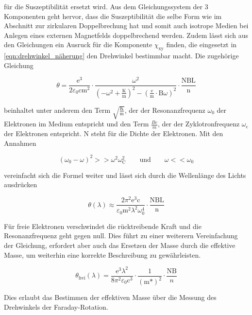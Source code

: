         für die Suszeptibilität ersetzt wird. Aus dem Gleichungssystem der 3 Komponenten geht hervor, dass die Suszeptibilität die selbe Form wie im Abschnitt zur zirkularen Doppelbrechung hat und somit auch 
        isotrope Medien bei Anlegen eines externen Magnetfelds doppelbrechend werden. Zudem lässt sich aus den Gleichungen ein Ausruck für die Komponente $\chi_{\text{xy}}$ finden, die eingesetzt in 
        \ref{eqn:drehwinkel_näherung} den Drehwinkel bestimmbar macht. Die zugehörige Gleichung

        \begin{equation*}
            \theta = \frac{\text{e}^3}{2\varepsilon_0\text{cm}^2} \cdot \frac{\omega^2}{\left(-\omega^2 + \frac{\text{K}}{\text{m}}\right)^2 - \left(\frac{\text{e}}{\text{m}} \cdot \text{B} \omega\right)^2} \cdot \frac{\text{NBL}}{\text{n}}
        \end{equation*}

        beinhaltet unter anderem den Term $\sqrt{\frac{\text{K}}{\text{m}}}$, der der Resonanzfrequenz $\omega_0$ der Elektronen im Medium entspricht und den Term $\frac{Be}{m}$, der der Zyklotronfrequenz 
        $\omega_{\text{c}}$ der Elektronen entspricht. N steht für die Dichte der Elektronen. Mit den Annahmen
        
        \begin{equation*}
            \left(\omega_0 - \omega\right)^2 >> \omega^2 \omega_{\text{C}}^2 \qquad \text{und} \qquad \omega << \omega_0
        \end{equation*}

        vereinfacht sich die Formel weiter und lässt sich durch die Wellenlänge des Lichts ausdrücken

        \begin{equation*}
            \theta(\lambda) \approx \frac{2\pi^2\text{e}^3\text{c}}{\varepsilon_0 \text{m}^2 \lambda^2 \omega_0^4} \cdot \frac{\text{NBL}}{\text{n}}
        \end{equation*}

        Für freie Elektronen verschwindet die rücktreibende Kraft und die Resonanzfrequenz geht gegen null. Dies führt zu einer weiterern Vereinfachung der Gleichung, erfordert aber auch das Ersetzen der Masse
        durch die effektive Masse, um weiterhin eine korrekte Beschreibung zu gewährleisten.

        \begin{equation}
            \theta_{\text{frei}}(\lambda) = \frac{\text{e}^3 \lambda^2}{8\pi^2\varepsilon_0 \text{c}^3} \cdot \frac{1}{(\text{m*})^2} \cdot \frac{\text{NB}}{n}
            \label{eqn:faraday}
        \end{equation}

        Dies erlaubt das Bestimmen der effektiven Masse über die Messung des Drehwinkels der Faraday-Rotation.



        